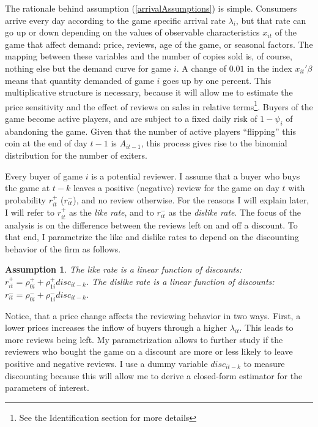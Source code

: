 \documentclass[12pt,pagebackref]{article}
\newtheorem{assumption}{Assumption}[section]
\begin{document}
The rationale behind assumption (\ref{arrivalAssumptions}) is simple.
Consumers arrive every day according to the game specific arrival rate
\(\lambda_i\), but that rate can go up or down depending on the values
of observable characteristics \(x_{it}\) of the game that affect demand:
price, reviews, age of the game, or seasonal factors. The mapping
between these variables and the number of copies sold is, of course,
nothing else but the demand curve for game \(i\). A change of \(0.01\)
in the index \(x_{it}'\beta\) means that quantity demanded of game \(i\)
goes up by one percent. This multiplicative structure is necessary,
because it will allow me to estimate the price sensitivity and the
effect of reviews on sales in relative
terms\footnote{See the Identification section for more details}. Buyers
of the game become active players, and are subject to a fixed daily risk
of \(1-\psi_i\) of abandoning the game. Given that the number of active
players ``flipping'' this coin at the end of day \(t-1\) is
\(A_{it-1}\), this process gives rise to the binomial distribution for
the number of exiters.

Every buyer of game \(i\) is a potential reviewer. I assume that a buyer
who buys the game at \(t-k\) leaves a positive (negative) review for the
game on day \(t\) with probability \(r_{it}^+\) (\(r_{it}^-\)), and no
review otherwise. For the reasons I will explain later, I will refer to
\(r_{it}^+\) as the \emph{like rate}, and to \(r_{it}^-\) as the
\emph{dislike rate}. The focus of the analysis is on the difference
between the reviews left on and off a discount. To that end, I
parametrize the like and dislike rates to depend on the discounting
behavior of the firm as follows.

\begin{assumption}\label{likeDiscountAss}
The like rate is a linear function of discounts:
$r_{it}^+ = \rho_{0i}^+ + \rho_{1i}^+ disc_{it-k}$.  The dislike rate is a linear function of discounts: $r_{it}^- = \rho_{0i}^- + \rho_{1i}^- disc_{it-k}$.
\end{assumption}

\noindent Notice, that a price change affects the reviewing behavior in
two ways. First, a lower prices increases the inflow of buyers through a
higher \(\lambda_{it}\). This leads to more reviews being left. My
parametrization allows to further study if the reviewers who bought the
game on a discount are more or less likely to leave positive and
negative reviews. I use a dummy variable \(disc_{it-k}\) to measure
discounting because this will allow me to derive a closed-form estimator
for the parameters of interest.
\end{document}
